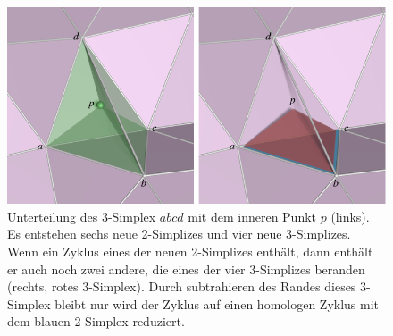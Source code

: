 %
%
%
\begin{figure}
\centering
\includegraphics{chapters/120-topologie/images/zyklus.pdf}
\caption{Unterteilung des 3-Simplex $abcd$ mit dem inneren Punkt $p$
(links).
Es entstehen sechs neue 2-Simplizes und vier neue 3-Simplizes.
Wenn ein Zyklus eines der neuen 2-Simplizes enthält, dann enthält
er auch noch zwei andere, die eines der vier 3-Simplizes beranden
(rechts, rotes 3-Simplex).
Durch subtrahieren des Randes dieses 3-Simplex bleibt nur
wird der Zyklus auf einen homologen Zyklus mit dem blauen 2-Simplex
reduziert.
\label{buch:topologie:simplex:fig:zyklus}}
\end{figure}
